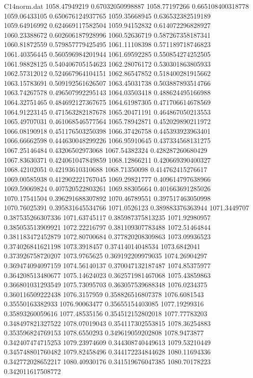 \begin{filecontents}{C14norm.dat}
1058.47949219			0.67032050998887
1058.77197266			0.665108400318778
1059.06433105			0.650676124937765
1059.35668945			0.636532382519189
1059.64916992			0.624669117582504
1059.94152832			0.614072296828927
1060.23388672			0.602606187928996
1060.52636719			0.587267358187341
1060.81872559			0.579857779425495
1061.11108398			0.571189718746823
1061.40356445			0.560596984201944
1061.69592285			0.550854274252505
1061.98828125			0.540406705154623
1062.28076172			0.530301863805933
1062.57312012			0.524667964104151
1062.86547852			0.518400281915662
1063.15783691			0.509192561626507
1063.45031738			0.503887893514766
1063.74267578			0.496507992295143
1064.03503418			0.488624495166988
1064.32751465			0.484692127367675
1064.61987305			0.471706614678569
1064.91223145			0.471563282187678
1065.20471191			0.464867050213553
1065.49707031			0.461068546577564
1065.78942871			0.452029890211972
1066.08190918			0.451176503250398
1066.37426758			0.445393923963401
1066.66662598			0.444630048299226
1066.95910645			0.437334568131275
1067.25146484			0.43206502973068
1067.54382324			0.428287260680429
1067.83630371			0.424061047849859
1068.12866211			0.420669390400327
1068.42102051			0.42193610310688
1068.71350098			0.414762415276617
1069.00585938			0.412902221767045
1069.29821777			0.409614797638966
1069.59069824			0.407520522803261
1069.88305664			0.401663691285026
1070.17541504			0.396291688307892
1070.46789551			0.397517463050998
1070.76025391			0.395831645534766
1071.0526123			0.389883376363944
1071.3449707			0.387535266307336
1071.63745117			0.385987375813235
1071.92980957			0.385053513909921
1072.22216797			0.381109307783488
1072.51464844			0.381183472452879
1072.80700684			0.377820208309863
1073.09936523			0.374026841621198
1073.3918457			0.37414014048534
1073.6842041			0.373926758720207
1073.9765625			0.369192209979035
1074.26904297			0.369474094097159
1074.56140137			0.370047132187487
1074.85375977			0.364208513480677
1075.14624023			0.362571981467068
1075.43859863			0.366801031293549
1075.73095703			0.363057539688348
1076.0234375			0.360116509222438
1076.3157959			0.358826516807378
1076.6081543			0.35550163382933
1076.90063477			0.35655154403085
1077.19299316			0.35893260059616
1077.48535156			0.354512152802018
1077.77783203			0.348497821327522
1078.07019043			0.354117302553815
1078.36254883			0.353596824769153
1078.6550293			0.349619059202808
1078.9473877			0.342407474715253
1079.23974609			0.344308740449613
1079.53210449			0.345748801760482
1079.82458496			0.344172234844628
1080.11694336			0.342772028652217
1080.40930176			0.341519676047385
1080.70178223			0.342011617508772

\end{filecontents}
